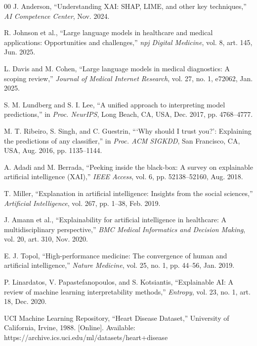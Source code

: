 \documentclass{ieeeaccess}
\begin{document}
\begin{thebibliography}{00}
 J. Anderson, ``Understanding XAI: SHAP, LIME, and other key techniques,'' \emph{AI Competence Center}, Nov. 2024.

 R. Johnson et al., ``Large language models in healthcare and medical applications: Opportunities and challenges,'' \emph{npj Digital Medicine}, vol. 8, art. 145, Jun. 2025.

 L. Davis and M. Cohen, ``Large language models in medical diagnostics: A scoping review,'' \emph{Journal of Medical Internet Research}, vol. 27, no. 1, e72062, Jan. 2025.

 S. M. Lundberg and S. I. Lee, ``A unified approach to interpreting model predictions,'' in \emph{Proc. NeurIPS}, Long Beach, CA, USA, Dec. 2017, pp. 4768--4777.

 M. T. Ribeiro, S. Singh, and C. Guestrin, ```Why should I trust you?': Explaining the predictions of any classifier,'' in \emph{Proc. ACM SIGKDD}, San Francisco, CA, USA, Aug. 2016, pp. 1135--1144.

 A. Adadi and M. Berrada, ``Peeking inside the black-box: A survey on explainable artificial intelligence (XAI),'' \emph{IEEE Access}, vol. 6, pp. 52138--52160, Aug. 2018.

 T. Miller, ``Explanation in artificial intelligence: Insights from the social sciences,'' \emph{Artificial Intelligence}, vol. 267, pp. 1--38, Feb. 2019.

 J. Amann et al., ``Explainability for artificial intelligence in healthcare: A multidisciplinary perspective,'' \emph{BMC Medical Informatics and Decision Making}, vol. 20, art. 310, Nov. 2020.

 E. J. Topol, ``High-performance medicine: The convergence of human and artificial intelligence,'' \emph{Nature Medicine}, vol. 25, no. 1, pp. 44--56, Jan. 2019.

 P. Linardatos, V. Papastefanopoulos, and S. Kotsiantis, ``Explainable AI: A review of machine learning interpretability methods,'' \emph{Entropy}, vol. 23, no. 1, art. 18, Dec. 2020.

 UCI Machine Learning Repository, ``Heart Disease Dataset,'' University of California, Irvine, 1988. [Online]. Available: https://archive.ics.uci.edu/ml/datasets/heart+disease

\end{thebibliography}

\end{document}
